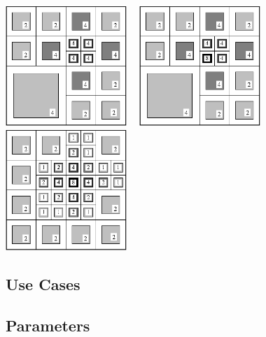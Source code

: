 \ \\
\centerline{\includegraphics[width=1.8in]{amr2-8.eps} \ \
            \includegraphics[width=1.8in]{amr2-9.eps} \ \
            \includegraphics[width=1.8in]{amr2-11.eps}}

\subsection{Use Cases}
\subsection{Parameters}
